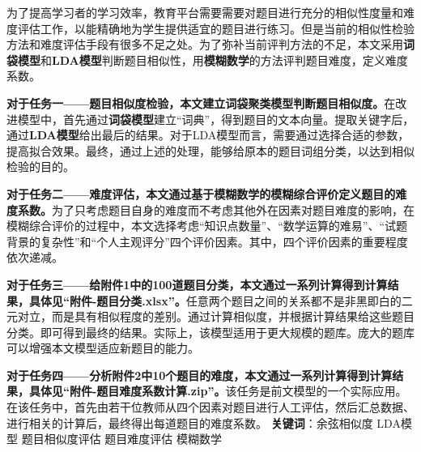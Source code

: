 为了提高学习者的学习效率，教育平台需要需要对题目进行充分的相似性度量和难度评估工作，以能精确地为学生提供适宜的题目进行练习。但是当前的相似性检验方法和难度评估手段有很多不足之处。为了弥补当前评判方法的不足，本文采用\textbf{词袋模型}和\textbf{LDA模型}判断题目相似性，用\textbf{模糊数学}的方法评判题目难度，定义难度系数。

\textbf{对于任务一——题目相似度检验，本文建立词袋聚类模型判断题目相似度。}在改进模型中，首先通过\textbf{词袋模型}建立“词典”，得到题目的文本向量。提取关键字后，通过\textbf{LDA模型}给出最后的结果。对于LDA模型而言，需要通过选择合适的参数，提高拟合效果。最终，通过上述的处理，能够给原本的题目词组分类，以达到相似检验的目的。

\textbf{对于任务二——难度评估，本文通过基于模糊数学的模糊综合评价定义题目的难度系数。}为了只考虑题目自身的难度而不考虑其他外在因素对题目难度的影响，在模糊综合评价的过程中，本文选择考虑“知识点数量”、“数学运算的难易”、“试题背景的复杂性”和“个人主观评分”四个评价因素。其中，四个评价因素的重要程度依次递减。

\textbf{对于任务三——给附件1中的100道题目分类，本文通过一系列计算得到计算结果，具体见“附件-题目分类.xlsx”。}任意两个题目之间的关系都不是非黑即白的二元对立，而是具有相似程度的差别。通过计算相似度，并根据计算结果给这些题目分类。即可得到最终的结果。实际上，该模型适用于更大规模的题库。庞大的题库可以增强本文模型适应新题目的能力。

\textbf{对于任务四——分析附件2中10个题目的难度，本文通过一系列计算得到计算结果，具体见“附件-题目难度系数计算.zip”。}该任务是前文模型的一个实际应用。在该任务中，首先由若干位教师从四个因素对题目进行人工评估，然后汇总数据、进行相关的计算后，最终得出每道题目的难度系数。
\newline
\newline
\textbf{关键词}：余弦相似度 \quad LDA模型 \quad 题目相似度评估 \quad 题目难度评估 \quad 模糊数学

\newpage
\thispagestyle{empty}
\tableofcontents